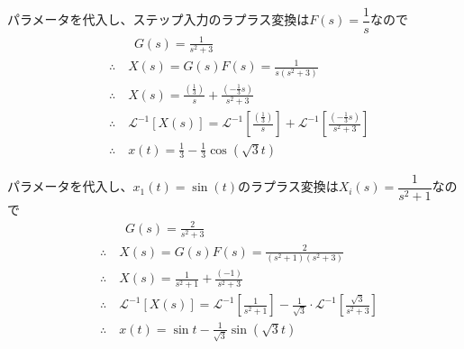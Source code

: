 \documentclass[a4paper,12pt]{article}
\begin{document}
\begin{tcolorbox}[title={4. (5)\(m=1,d=0,k_1=1,k_2=2\)とし、ステップ応答を求めよ。 
    }]
    パラメータを代入し、ステップ入力のラプラス変換は\(F(s)=\dfrac{1}{s}\)なので
    \vspace{-4mm}
    \begin{align*}
        &\qquad G(s) = \frac{1}{s^2 + 3} \\
        &\therefore \quad X(s) = G(s) F(s) = \frac{1}{s(s^2+3)} \\
        &\therefore \quad X(s) = \frac{\left(\frac{1}{3}\right)}{s}
        + \frac{\left(-\frac{1}{3}s\right)}{s^2+3} \\
        &\therefore \quad \mathcal{L}^{-1} \left[ X(s)\right] 
        = \mathcal{L}^{-1} \left[\frac{\left(\frac{1}{3}\right)}{s}\right] 
        + \mathcal{L}^{-1} \left[\frac{\left(-\frac{1}{3}s\right)}{s^2+3} \right] \\
        &\therefore \quad x(t) = \frac{1}{3} - \frac{1}{3}  \cos \left( \sqrt{3} t \right)
    \end{align*}

\end{tcolorbox}


\begin{tcolorbox}[title={4. (6)\(m=1,d=0,k_1=2,k_2=1\)とし、入力変位\(x_1(t)=\sin(t)\)を与えたときの応
\indent \quad 答を求めよ。 }]
パラメータを代入し、\(x_1(t)=\sin(t)\)のラプラス変換は\(X_i(s)=\dfrac{1}{s^2+1}\)なので
    \vspace{-4mm}
    \begin{align*}
        &\qquad G(s) = \frac{2}{s^2 +3} \\
        &\therefore \quad X(s) = G(s) F(s) = \frac{2}{(s^2 +1)(s^2+3)} \\
        &\therefore \quad X(s) =  \frac{1}{s^2 +1}
        + \frac{(-1)}{s^2+3}\\
        &\therefore \quad \mathcal{L}^{-1} \left[ X(s)\right] 
        = \mathcal{L}^{-1} \left[\frac{1}{s^2 +1} \right]
        - \frac{1}{\sqrt{3}} \cdot \mathcal{L}^{-1} \left[\frac{\sqrt{3}}{s^2+3} \right] \\
        &\therefore \quad x(t) = \sin t - \frac{1}{\sqrt{3}} \sin (\sqrt{3}t)
    \end{align*}
\end{tcolorbox}
\end{document}
